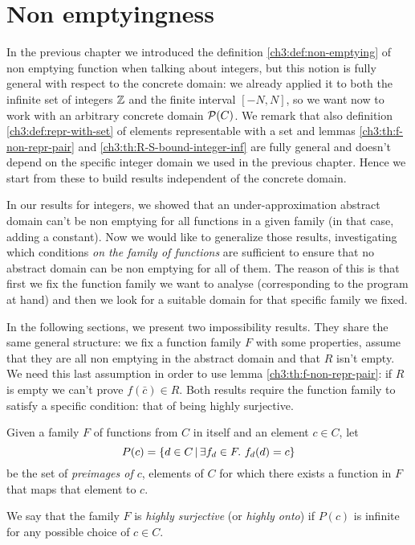 \section{Non emptyingness}
In the previous chapter we introduced the definition \ref{ch3:def:non-emptying} of non emptying function when talking about integers, but this notion is fully general with respect to the concrete domain: we already applied it to both the infinite set of integers $\mathbb{Z}$ and the finite interval $[-N, N]$, so we want now to work with an arbitrary concrete domain $\mathcal{P}(C)$.
We remark that also definition \ref{ch3:def:repr-with-set} of elements representable with a set and lemmas \ref{ch3:th:f-non-repr-pair} and \ref{ch3:th:R-S-bound-integer-inf} are fully general and doesn't depend on the specific integer domain we used in the previous chapter. Hence we start from these to build results independent of the concrete domain.

In our results for integers, we showed that an under-approximation abstract domain can't be non emptying for all functions in a given family (in that case, adding a constant). Now we would like to generalize those results, investigating which conditions \textit{on the family of functions} are sufficient to ensure that no abstract domain can be non emptying for all of them. The reason of this is that first we fix the function family we want to analyse (corresponding to the program at hand) and then we look for a suitable domain for that specific family we fixed.

In the following sections, we present two impossibility results. They share the same general structure: we fix a function family $F$ with some properties, assume that they are all non emptying in the abstract domain and that $R$ isn't empty. We need this last assumption in order to use lemma \ref{ch3:th:f-non-repr-pair}: if $R$ is empty we can't prove $f(\bar{c}) \in R$.
Both results require the function family to satisfy a specific condition: that of being highly surjective.

\begin{definition}\label{ch4:def:highly-onto-func-family}
	Given a family $F$ of functions from $C$ in itself and an element $c \in C$, let
	\[
	P(c) = \{ d \in C \,\vert\, \exists f_d \in F .\ f_d(d) = c \}
	\]
	be the set of \textit{preimages of $c$}, elements of $C$ for which there exists a function in $F$ that maps that element to $c$.

	We say that the family $F$ is \textit{highly surjective} (or \textit{highly onto}) if $P(c)$ is infinite for any possible choice of $c \in C$.
\end{definition}

